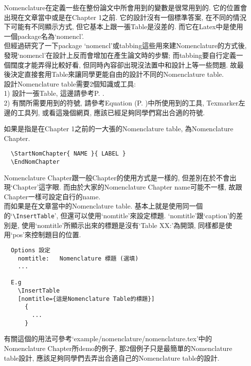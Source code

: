 
Nomenclature在定義一些在整份論文中所會用到的變數是很常用到的. 它的位置會出現在文章當中或是在Chapter 1之前. 它的設計沒有一個標準答案, 在不同的情況下可能有不同顯示方式, 但它基本上跟一張Table是沒差的. 而它在Latex中是使用一個package名為`nomencl'.\\

但經過研究了一下package `nomencl'或tabbing這些用來建Nomenclature的方式後, 發現`nomencl'在設計上反而會增加在產生論文時的步驟; 而tabbing要自行定義一個闊度才能弄得比較好看, 但同時內容卻出現沒法置中和設計上等一些問題. 故最後決定直接套用Table來讓同學更能自由的設計不同的Nomenclature table.\\

設計Nomenclature table需要2個知識或工具:\\
1) 設計一張Table, 這邊請參考P. .\\
2) 有關所需要用到的符號, 請參考Equation (P. )中所使用到的工具, Texmarker左邊的工具列, 或看這幾個網頁, 應該已經足夠同學們寫出合適的符號.

{}

如果是指是在Chapter 1之前的一大張的Nomenclature table, 為Nomenclature Chapter. 
  \begin{verbatim}
  \StartNomChapter{ NAME }{ LABEL }
  \EndNomChapter
  \end{verbatim}
Nomenclature Chapter跟一般Chapter的使用方式是一樣的, 但差別在於不會出現`Chapter'這字眼. 而由於大家的Nomenclature Chapter name可能不一樣, 故跟Chapter一樣可設定自行的name.\\

而如果是在文章當中的Nomenclature table. 基本上就是使用同一個的`\verb|\InsertTable|', 但還可以使用`nomtitle'來設定標題. `nomtitle'跟`caption'的差別是, 使用`nomtitle'所顯示出來的標題是沒有`Table XX:'為開頭, 同樣都是使用`pos'來控制題目的位置.

  \EmptyLine
  \begin{DescriptionFrame}
  \begin{verbatim}
  Options 設定
    nomtitle:   Nomenclature 標題 (選填)
    ...

  E.g
    \InsertTable
    [nomtitle={這是Nomenclature Table的標題}]
      {
        ...
      }
  \end{verbatim}
  \end{DescriptionFrame}
  \EmptyLine

有關這個的用法可參考`example/nomenclature/nomenclature.tex'中的Nomenclature Chapter所demo的例子, 那2個例子只是最簡單的Nomenclature table設計, 應該足夠同學們去弄出合適自己的Nomenclature table的設計.

